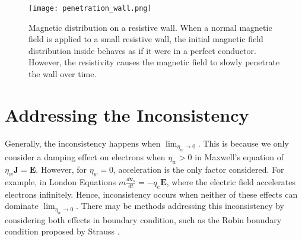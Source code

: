 \begin{figure}[H]
	\centering
	\texttt{[image: penetration\_wall.png]}
	\caption[Bx distribution on resistive wall]{Magnetic distribution on a resistive wall. When a normal magnetic field is applied to a small resistive wall, the initial magnetic field distribution inside behaves as if it were in a perfect conductor. However, the resistivity causes the magnetic field to slowly penetrate the wall over time.}
	\label{fig:smallResistivityWall}
\end{figure}
\section{Addressing the Inconsistency}
Generally, the inconsistency happens when $\lim_{\eta_w \to 0}$. This is because we only consider a damping effect on electrons when $\eta_w>0$ in Maxwell's equation of $\eta_w\mathbf{J}=\mathbf{E}$. However, for $\eta_w=0$, acceleration is the only factor considered. For example, in London Equations $m\frac{d\mathbf{v}_s}{dt}=-q_e\mathbf{E}$, where the electric field accelerates electrons infinitely. Hence, inconsistency occurs when neither of these effects can dominate $\lim_{\eta_w \to 0}$. There may be methods addressing this inconsistency by considering both effects in boundary condition, such as the Robin boundary condition proposed by Strauss \cite{strauss2014velocity}.  